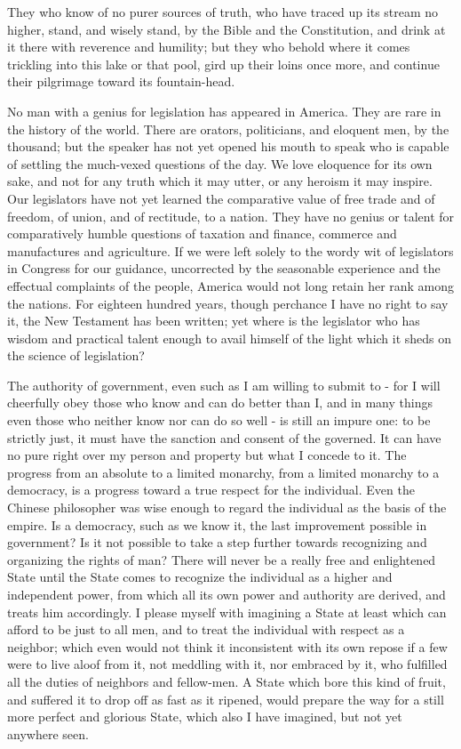 \documentclass[letterpaper,12pt,english]{sphinxmanual}
\begin{document}
They who know of no purer sources of truth, who have traced up its stream no higher, stand, and wisely stand, by the Bible and the Constitution, and drink at it there with reverence and humility; but they who behold where it comes trickling into this lake or that pool, gird up their loins once more, and continue their pilgrimage toward its fountain-head.

No man with a genius for legislation has appeared in America. They are rare in the history of the world. There are orators, politicians, and eloquent men, by the thousand; but the speaker has not yet opened his mouth to speak who is capable of settling the much-vexed questions of the day. We love eloquence for its own sake, and not for any truth which it may utter, or any heroism it may inspire. Our legislators have not yet learned the comparative value of free trade and of freedom, of union, and of rectitude, to a nation. They have no genius or talent for comparatively humble questions of taxation and finance, commerce and manufactures and agriculture. If we were left solely to the wordy wit of legislators in Congress for our guidance, uncorrected by the seasonable experience and the effectual complaints of the people, America would not long retain her rank among the nations. For eighteen hundred years, though perchance I have no right to say it, the New Testament has been written; yet where is the legislator who has wisdom and practical talent enough to avail himself of the light which it sheds on the science of legislation?

The authority of government, even such as I am willing to submit to - for I will cheerfully obey those who know and can do better than I, and in many things even those who neither know nor can do so well - is still an impure one: to be strictly just, it must have the sanction and consent of the governed. It can have no pure right over my person and property but what I concede to it. The progress from an absolute to a limited monarchy, from a limited monarchy to a democracy, is a progress toward a true respect for the individual. Even the Chinese philosopher was wise enough to regard the individual as the basis of the empire. Is a democracy, such as we know it, the last improvement possible in government? Is it not possible to take a step further towards recognizing and organizing the rights of man? There will never be a really free and enlightened State until the State comes to recognize the individual as a higher and independent power, from which all its own power and authority are derived, and treats him accordingly. I please myself with imagining a State at least which can afford to be just to all men, and to treat the individual with respect as a neighbor; which even would not think it inconsistent with its own repose if a few were to live aloof from it, not meddling with it, nor embraced by it, who fulfilled all the duties of neighbors and fellow-men. A State which bore this kind of fruit, and suffered it to drop off as fast as it ripened, would prepare the way for a still more perfect and glorious State, which also I have imagined, but not yet anywhere seen.
\end{document}

